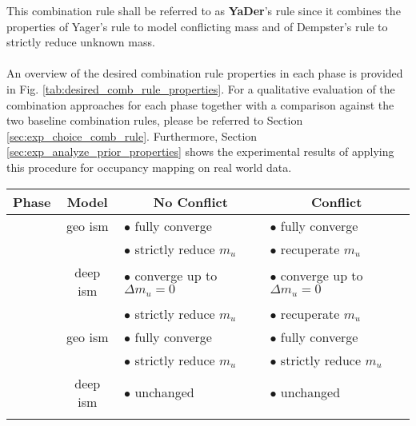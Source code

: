 This combination rule shall be referred to as \textbf{YaDer}'s rule since it combines the properties of Yager's rule to model conflicting mass and of Dempster's rule to strictly reduce unknown mass. 
\\\\
An overview of the desired combination rule properties in each phase is provided in Fig. \ref{tab:desired_comb_rule_properties}. For a qualitative evaluation of the combination approaches for each phase together with a comparison against the two baseline combination rules, please be referred to Section \ref{sec:exp_choice_comb_rule}. Furthermore, Section \ref{sec:exp_analyze_prior_properties} shows the experimental results of applying this procedure for occupancy mapping on real world data. 
\begin{center}
	\begin{tabular}{c|c|l|l}
		\multicolumn{1}{c|}{\bfseries Phase} & 
		\multicolumn{1}{c|}{\bfseries Model} &  	
		\multicolumn{1}{c|}{\bfseries No Conflict} &  	
		\multicolumn{1}{c}{\bfseries Conflict}\\
\hline
		\parbox[t]{5mm}{}
		& geo \gls{ism}
		& $\bullet$ fully converge & $\bullet$ fully converge \\
		&
		& $\bullet$ strictly reduce $m_u$& $\bullet$ recuperate $m_u$ \\
		& deep \gls{ism}
		& $\bullet$ converge up to $\Delta m_u = 0$ & $\bullet$ converge up to $\Delta m_u = 0$ \\
		&
		& $\bullet$ strictly reduce $m_u$ & $\bullet$ recuperate $m_u$ \\
\hline
\hline
	\parbox[t]{5mm}{} 
	& geo \gls{ism}
	& $\bullet$ fully converge & $\bullet$ fully converge \\
	& 
	& $\bullet$ strictly reduce $m_u$ & $\bullet$ strictly reduce $m_u$ \\
	&deep \gls{ism}
	& $\bullet$ unchanged & $\bullet$ unchanged \\
	&&&
	\end{tabular}
\end{center} 